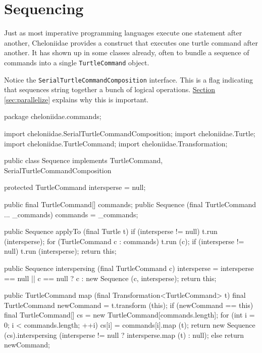 \documentclass{report}
\newcommand{\Ref}[2]{\hyperref[#2]{#1 \ref*{#2}}}
\begin{document}
\section {Sequencing} \label{sec:sequencing}
      Just as most imperative programming languages execute one statement after another, Cheloniidae provides a construct that executes one turtle command after
      another. It has shown up in some classes already, often to bundle a sequence of commands into a single {\tt TurtleCommand} object.

      Notice the {\tt SerialTurtleCommandComposition} interface. This is a flag indicating that sequences string together a bunch of logical operations.
      \Ref{Section}{sec:parallelize} explains why this is important.

\begin{javacode}
package cheloniidae.commands;

import cheloniidae.SerialTurtleCommandComposition;
import cheloniidae.Turtle;
import cheloniidae.TurtleCommand;
import cheloniidae.Transformation;

public class Sequence implements TurtleCommand, SerialTurtleCommandComposition {
  protected TurtleCommand intersperse = null;

  public final TurtleCommand[] commands;
  public Sequence (final TurtleCommand ... _commands) {commands = _commands;}

  public Sequence applyTo (final Turtle t) {if (intersperse != null) t.run (intersperse);
                                            for (TurtleCommand c : commands) {
                                              t.run (c);
                                              if (intersperse != null) t.run (intersperse);
                                            }
                                            return this;}

  public Sequence interspersing (final TurtleCommand c) {
    intersperse = intersperse == null || c == null ? c : new Sequence (c, intersperse);
    return this;
  }

  public TurtleCommand map (final Transformation<TurtleCommand> t) {
    final TurtleCommand newCommand = t.transform (this);
    if (newCommand == this) {
      final TurtleCommand[] cs = new TurtleCommand[commands.length];
      for (int i = 0; i < commands.length; ++i) cs[i] = commands[i].map (t);
      return new Sequence (cs).interspersing (intersperse != null ? intersperse.map (t) : null);
    } else return newCommand;
  }
}
\end{javacode}
\end{document}
